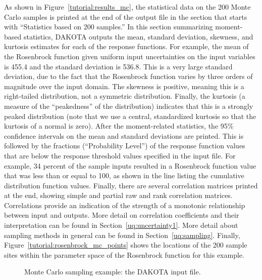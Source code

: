 As shown in Figure~\ref{tutorial:results_mc}, 
the statistical data on the 200 Monte Carlo samples is printed at the
end of the output file in the section that starts with ``Statistics
based on 200 samples.'' In this section summarizing 
moment-based statistics, DAKOTA outputs the
mean, standard deviation, skewness, and kurtosis estimates 
for each of the response functions.  For example, 
the mean of the Rosenbrock function given uniform input uncertainties 
on the input variables is 455.4 and the standard deviation is 536.8. 
This is a very large standard deviation, due to the fact that the 
Rosenbrock function varies by three orders of magnitude over the input 
domain.  The skewness is positive, meaning this is a right-tailed distribution, not a symmetric distribution.  Finally, the kurtosis (a measure of the ``peakedness'' of the distribution) indicates that 
this is a strongly peaked distribution (note that we use a central, standardized kurtosis so that the kurtosis of a normal is zero).  After the moment-related statistics, the 95\% confidence intervals on the mean and standard deviations are printed.  This is followed by
the fractions (``Probability Level'') of the response function values 
that are below the response threshold values specified in the input file. 
For example, 34 percent of the sample inputs resulted in a Rosenbrock 
function value that was less than or equal to 100, as shown in the line 
listing the cumulative distribution function values.  
Finally, there are several 
correlation matrices printed at the end, showing simple and partial 
raw and rank correlation matrices.  Correlations provide an indication 
of the strength of a monotonic relationship between input and outputs.  
More detail on correlation coefficients and their interpretation can be 
found in Section~\ref{uq:uncertainty1}. 
More detail about sampling methods in general can be found in 
Section~\ref{uq:sampling}.  Finally,  
Figure~\ref{tutorial:rosenbrock_mc_points} shows the locations
of the 200 sample sites within the parameter space of the Rosenbrock
function for this example.

\begin{figure}[ht!]
  \centering
  \begin{bigbox}
    \begin{small}
    \end{small}
  \end{bigbox}
  \caption{Monte Carlo sampling example: the DAKOTA input file.}
  \label{tutorial:rosenbrock_mc}
\end{figure}

